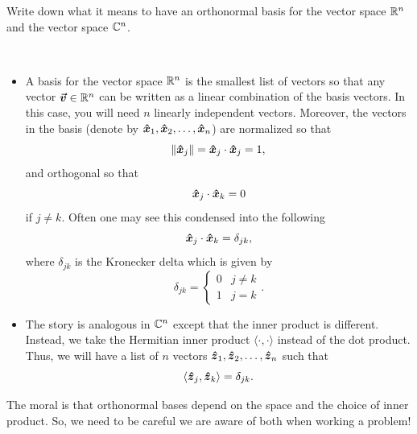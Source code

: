 \documentclass[12pt]{article} %
\newcommand{\innprod}[2]{\langle #1, #2\rangle}
\begin{document}
\newpage
\begin{problem}
	Write down what it means to have an orthonormal basis for the vector space $\mathbb{R}^n$ and the vector space $\mathbb{C}^n$.
\end{problem}
\begin{solution}~
	\begin{itemize}
		\item A basis for the vector space $\mathbb{R}^n$ is the smallest list of vectors so that any vector $\boldsymbol{\vec{v}}\in \mathbb{R}^n$ can be written as a linear combination of the basis vectors. In this case, you will need $n$ linearly independent vectors. Moreover, the vectors in the basis (denote by $\boldsymbol{\hat{x}}_1,\boldsymbol{\hat{x}}_2,\dots,\boldsymbol{\hat{x}}_n$) are normalized so that
		\[
		\|\boldsymbol{\hat{x}}_j\|=\boldsymbol{\hat{x}}_j \cdot \boldsymbol{\hat{x}}_j=1,
		\]
		and orthogonal so that
		\[
		\boldsymbol{\hat{x}}_j\cdot \boldsymbol{\hat{x}}_k=0
		\]
		if $j\neq k$. Often one may see this condensed into the following
		\[
		\boldsymbol{\hat{x}}_j \cdot \boldsymbol{\hat{x}}_k = \delta_{jk},
		\]
		where $\delta_{jk}$ is the Kronecker delta which is given by
		\[
		\delta_{jk} =  \begin{cases} 0 & j\neq k \\ 1 & j=k\end{cases}.
		\]
		\item The story is analogous in $\mathbb{C}^n$ except that the inner product is different. Instead, we take the Hermitian inner product $\innprod{\cdot}{\cdot}$ instead of the dot product.  Thus, we will have a list of $n$ vectors $\boldsymbol{\hat{z}}_1,\boldsymbol{\hat{z}}_2,\dots,\boldsymbol{\hat{z}}_n$ such that
		\[
		\innprod{\zhat_j}{\zhat_k} = \delta_{jk}.
		\]
	\end{itemize}
	The moral is that orthonormal bases depend on the space and the choice of inner product. So, we need to be careful we are aware of both when working a problem!
\end{solution}
\end{document}
